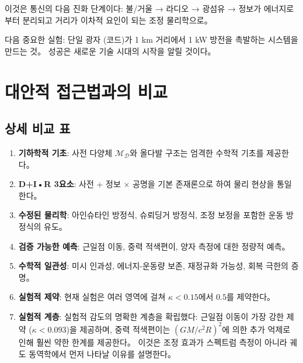 \documentclass[11pt,a4paper]{article}
\begin{document}
이것은 통신의 다음 진화 단계이다: 불/거울 → 라디오 → 광섬유 → 정보가 에너지로부터 분리되고 거리가 이차적 요인이 되는 조정 물리학으로。

다음 중요한 실험: 단일 광자 (코드)가 1 km 거리에서 1 kW 방전을 촉발하는 시스템을 만드는 것。 성공은 새로운 기술 시대의 시작을 알릴 것이다。

\section{대안적 접근법과의 비교}
\subsection{상세 비교 표}
\begin{enumerate}
\item \textbf{기하학적 기초}: 사전 다양체 $\mathcal{M}_{\mathcal{D}}$와 올다발 구조는 엄격한 수학적 기초를 제공한다。

\item \textbf{D+I•R 3요소}: 사전 + 정보 × 공명을 기본 존재론으로 하여 물리 현상을 통일한다。

\item \textbf{수정된 물리학}: 아인슈타인 방정식, 슈뢰딩거 방정식, 조정 보정을 포함한 운동 방정식의 유도。

\item \textbf{검증 가능한 예측}: 근일점 이동, 중력 적색편이, 양자 측정에 대한 정량적 예측。

\item \textbf{수학적 일관성}: 미시 인과성, 에너지-운동량 보존, 재정규화 가능성, 회복 극한의 증명。

\item \textbf{실험적 제약}: 현재 실험은 여러 영역에 걸쳐 $\kappa < 0.15$에서 $0.5$를 제약한다。

\item \textbf{실험적 계층}: 실험적 감도의 명확한 계층을 확립했다: 근일점 이동이 가장 강한 제약 ($\kappa < 0.093$)을 제공하며, 중력 적색편이는 $(GM/c^2R)^2$에 의한 추가 억제로 인해 훨씬 약한 한계를 제공한다。 이것은 조정 효과가 스펙트럼 측정이 아니라 궤도 동역학에서 먼저 나타날 이유를 설명한다。
\end{enumerate}
\end{document}
